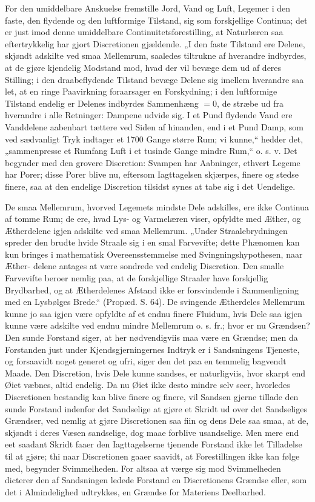 \documentclass[12pt,a4paper]{book}
\begin{document}
For den umiddelbare Anskuelse fremstille Jord, Vand og
Luft, Legemer i den faste, den flydende og den luftformige
Tilstand, sig som forskjellige Continua; det er just imod
denne umiddelbare Continuitetsforestilling, at Naturlæren saa
eftertrykkelig har gjort Discretionen gjældende. „I den faste
Tilstand ere Delene, skjøndt adskilte ved smaa Mellemrum,
saaledes tiltrukne af hverandre indbyrdes, at de gjøre
kjendelig Modstand mod, hvad der vil bevæge dem ud af deres
Stilling; i den draabeflydende Tilstand bevæge Delene sig
imellem hverandre saa let, at en ringe Paavirkning
foraarsager en Forskydning; i den luftformige Tilstand endelig er
Delenes indbyrdes Sammenhæng $= 0$, de stræbe ud fra
hverandre i alle Retninger: Dampene udvide sig. I et
Pund flydende Vand ere Vanddelene aabenbart tættere ved
Siden af hinanden, end i et Pund Damp, som ved
sædvanligt Tryk indtager et 1700 Gange større Rum; vi kunne,“
hedder det, „sammenpresse et Rumfang Luft i et tusinde
Gange mindre Rum,“ o. s. v. Det begynder med den grovere
Discretion: Svampen har Aabninger, ethvert Legeme har
Porer; disse Porer blive nu, eftersom Iagttagelsen skjærpes,
finere og stedse finere, saa at den endelige Discretion
tilsidst synes at tabe sig i det Uendelige.

De smaa Mellemrum, hvorved Legemets mindste Dele
adskilles, ere ikke Continua af tomme Rum; de ere, hvad
Lys- og Varmelæren viser, opfyldte med Æther, og
Ætherdelene igjen adskilte ved smaa Mellemrum. „Under
Straalebrydningen spreder den brudte hvide Straale sig i en smal
Farvevifte; dette Phænomen kan kun bringes i mathematisk
Overeensstemmelse med Svingningshypothesen, naar Æther-
delene antages at være sondrede ved endelig Discretion. Den
smalle Farvevifte beroer nemlig paa, at de forskjellige Straaler
have forskjellig Brydbarhed, og at Ætherdelenes Afstand ikke
er forsvindende i Sammenligning med en Lysbølges Brede.“
(Propæd. S. 64). De svingende Ætherdeles Mellemrum
kunne jo saa igjen være opfyldte af et endnu finere Fluidum,
hvis Dele saa igjen kunne være adskilte ved endnu mindre
Mellemrum o. s. fr.; hvor er nu Grændsen? Den sunde
Forstand siger, at her nødvendigviis maa være en Grændse;
men da Forstanden just under Kjendsgjerningernes Indtryk er
i Sandsningens Tjeneste, og forsaavidt noget generet og ufri,
siger den det paa en temmelig bagvendt Maade. Den
Discretion, hvis Dele kunne sandses, er naturligviis, hvor skarpt
end Øiet væbnes, altid endelig. Da nu Øiet ikke desto
mindre selv seer, hvorledes Discretionen bestandig kan blive
finere og finere, vil Sandsen gjerne tillade den sunde
Forstand indenfor det Sandselige at gjøre et Skridt ud over
det Sandseliges Grændser, ved nemlig at gjøre Discretionen
saa fiin og dens Dele saa smaa, at de, skjøndt i deres Væsen
sandselige, dog maae forblive usandselige. Men mere end eet
saadant Skridt faaer den Iagttagelserne tjenende Forstand ikke
let Tilladelse til at gjøre; thi naar Discretionen gaaer
saavidt, at Forestillingen ikke kan følge med, begynder
Svimmelheden. For altsaa at værge sig mod Svimmelheden dicterer
den af Sandsningen ledede Forstand en Discretionens
Grændse eller, som det i Almindelighed udtrykkes, en Grændse
for Materiens Deelbarhed.
\end{document}
